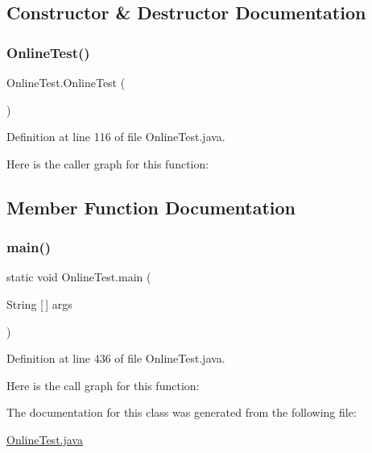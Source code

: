 \subsection{Constructor \& Destructor Documentation}
\mbox{\label{class_online_test_aa142859790bd63baf85669ab1417a275}} 
\subsubsection{\texorpdfstring{Online\+Test()}{OnlineTest()}}
{\footnotesize\ttfamily Online\+Test.\+Online\+Test (\begin{DoxyParamCaption}{ }\end{DoxyParamCaption})\hspace{0.3cm}{\ttfamily [protected]}}



Definition at line 116 of file Online\+Test.\+java.

Here is the caller graph for this function\+:


\subsection{Member Function Documentation}
\mbox{\label{class_online_test_a9a7715720700f7fb5693592dbca1f759}} 
\subsubsection{\texorpdfstring{main()}{main()}}
{\footnotesize\ttfamily static void Online\+Test.\+main (\begin{DoxyParamCaption}\item[{String \mbox{[}$\,$\mbox{]}}]{args }\end{DoxyParamCaption})\hspace{0.3cm}{\ttfamily [static]}}



Definition at line 436 of file Online\+Test.\+java.

Here is the call graph for this function\+:


The documentation for this class was generated from the following file\+:\begin{DoxyCompactItemize}
\item 
\mbox{\hyperlink{_online_test_8java}{Online\+Test.\+java}}\end{DoxyCompactItemize}
